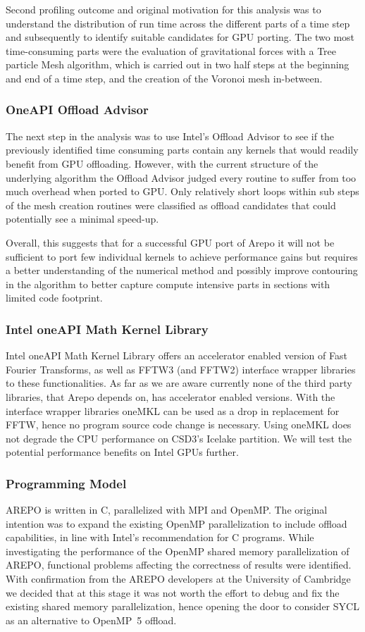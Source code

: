 \documentclass[../main]{subfiles}
\begin{document}
Second profiling outcome and original motivation for this analysis was to understand the distribution of run time across the different parts of a time step and subsequently to identify suitable candidates for GPU porting.
The two most time-consuming parts were the evaluation of gravitational forces with a Tree particle Mesh algorithm, which is carried out in two half steps at the beginning and end of a time step, and the creation of the Voronoi mesh in-between.

\subsubsection{OneAPI Offload Advisor}
The next step in the analysis was to use Intel's Offload Advisor to see if the previously identified time consuming parts contain any kernels that would readily benefit from GPU offloading.
However, with the current structure of the underlying algorithm the Offload Advisor judged every routine to suffer from too much overhead when ported to GPU.
Only relatively short loops within sub steps of the mesh creation routines were classified as offload candidates that could potentially see a minimal speed-up.

Overall, this suggests that for a successful GPU port of Arepo it will not be sufficient to port few individual kernels to achieve performance gains but requires a better understanding of the numerical method and possibly improve contouring in the algorithm to better capture compute intensive parts in sections with limited code footprint.


\subsubsection{Intel oneAPI Math Kernel Library}
Intel oneAPI Math Kernel Library offers an accelerator enabled version of Fast Fourier Transforms, as well as FFTW3 (and FFTW2) interface wrapper libraries to these functionalities.
As far as we are aware currently none of the third party libraries, that Arepo depends on, has accelerator enabled versions.
With the interface wrapper libraries oneMKL can be used as a drop in replacement for FFTW, hence no program source code change is necessary.
Using oneMKL does not degrade the CPU performance on CSD3's Icelake partition.
We will test the potential performance benefits on Intel GPUs further.

\subsubsection{Programming Model}
AREPO is written in C, parallelized with MPI and OpenMP.
The original intention was to expand the existing OpenMP parallelization to include offload capabilities, in line with Intel's recommendation for C programs.
While investigating the performance of the OpenMP shared memory parallelization of AREPO, functional problems affecting the correctness of results were identified.
With confirmation from the AREPO developers at the University of Cambridge we decided that at this stage it was not worth the effort to debug and fix the existing shared memory parallelization, hence opening the door to consider SYCL as an alternative to OpenMP~5 offload.
\end{document}
